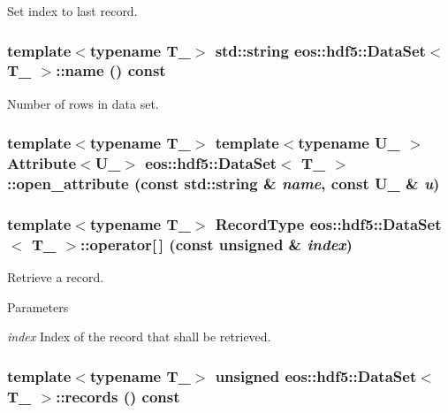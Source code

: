 Set index to last record. \hypertarget{classeos_1_1hdf5_1_1DataSet_a4ab5c04c21708d32eb7c36120f99b989}{
\subsubsection[{name}]{\setlength{\rightskip}{0pt plus 5cm}template$<$typename T\_\-$>$ std::string {\bf eos::hdf5::DataSet}$<$ T\_\- $>$::name () const}}
\label{classeos_1_1hdf5_1_1DataSet_a4ab5c04c21708d32eb7c36120f99b989}


Number of rows in data set. \hypertarget{classeos_1_1hdf5_1_1DataSet_ac904229b8a8e111889535507a62652c9}{
\subsubsection[{open\_\-attribute}]{\setlength{\rightskip}{0pt plus 5cm}template$<$typename T\_\-$>$ template$<$typename U\_\- $>$ {\bf Attribute}$<$U\_\-$>$ {\bf eos::hdf5::DataSet}$<$ T\_\- $>$::open\_\-attribute (const std::string \& {\em name}, \/  const U\_\- \& {\em u})}}
\label{classeos_1_1hdf5_1_1DataSet_ac904229b8a8e111889535507a62652c9}
\hypertarget{classeos_1_1hdf5_1_1DataSet_a61acdb337452f42d2bd2f3ccdee989f6}{
\subsubsection[{operator[]}]{\setlength{\rightskip}{0pt plus 5cm}template$<$typename T\_\-$>$ {\bf RecordType} {\bf eos::hdf5::DataSet}$<$ T\_\- $>$::operator\mbox{[}$\,$\mbox{]} (const unsigned \& {\em index})}}
\label{classeos_1_1hdf5_1_1DataSet_a61acdb337452f42d2bd2f3ccdee989f6}
Retrieve a record.


\begin{DoxyParams}{Parameters}
\item[{\em index}]Index of the record that shall be retrieved. \end{DoxyParams}
\hypertarget{classeos_1_1hdf5_1_1DataSet_af19723594ac6d14c327f90821187b14c}{
\subsubsection[{records}]{\setlength{\rightskip}{0pt plus 5cm}template$<$typename T\_\-$>$ unsigned {\bf eos::hdf5::DataSet}$<$ T\_\- $>$::records () const}}
\label{classeos_1_1hdf5_1_1DataSet_af19723594ac6d14c327f90821187b14c}


